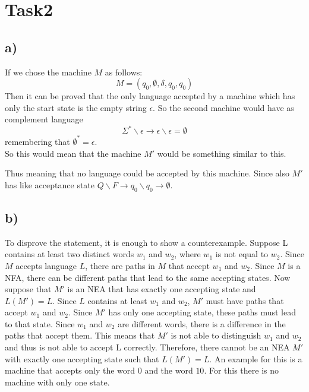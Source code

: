 \chapter{Task2}
\section{a)}
If we chose the machine $M$ as follows: $$M = (q_0, \emptyset, \delta, q_0, {q_0})$$
Then it can be proved that the only language accepted by a machine which has only the start state is the empty string $\epsilon$. 
So the second machine would have as complement language $$\Sigma^* \backslash \epsilon \rightarrow \epsilon \backslash \epsilon = \emptyset$$ remembering that $\emptyset^* = \epsilon$.\\
 So this would mean that the machine $M'$ would be something similar to this. 
\begin{center}
\end{center}
Thus meaning that no language could be accepted by this machine. Since also $M'$ has like acceptance state $Q \backslash F \rightarrow q_0 \backslash q_0 \rightarrow \emptyset$. 
\section{b)}
To disprove the statement, it is enough to show a counterexample. Suppose L contains at least two distinct words $w_1$ and $w_2$, where $w_1$ is not equal to $w_2$. Since $M$ accepts language $L$, there are paths in $M$ that accept $w_1$ and $w_2$. Since $M$ is a NFA, there can be different paths that lead to the same accepting states. Now suppose that $M'$ is an NEA that has exactly one accepting state and $L(M') = L$. Since $L$ contains at least $w_1$ and $w_2$, $M'$ must have paths that accept $w_1$ and $w_2$. Since $M'$ has only one accepting state, these paths must lead to that state. Since $w_1$ and $w_2$ are different words, there is a difference in the paths that accept them. This means that $M'$ is not able to distinguish $w_1$ and $w_2$ and thus is not able to accept L correctly. Therefore, there cannot be an NEA $M'$ with exactly one accepting state such that $L(M') = L$.
An example for this is a machine that accepts only the word $0$ and the word $10$. For this there is no machine with only one state. \\
